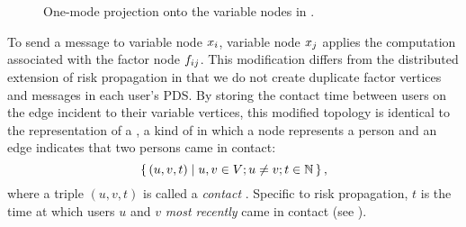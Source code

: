 \begin{figure}[htb]
\centering
{}
\caption[One-mode projection of a factor graph]{One-mode projection onto the variable nodes in .}
\label{fig:projected}
\end{figure}

To send a message to variable node $\vVariable[i]$, variable node $\vVariable[j]$ applies the computation associated with the factor node $\vFactor[ij]$. This modification differs from the distributed extension of risk propagation \citep{Ayday2021} in that we do not create duplicate factor vertices and messages in each user's PDS. By storing the contact time between users on the edge incident to their variable vertices, this modified topology is identical to the  representation of a , a kind of  in which a node represents a person and an edge indicates that two persons came in contact:
\begin{equation}
  \set{ (u, v, t) | u, v \in V; u \neq v; t \in \mathbb{N}}, \label{eq:contact-sequence}
\end{equation}
where a triple $(u, v, t)$ is called a \emph{contact} \citep{Holme2012}. Specific to risk propagation, $t$ is the time at which users $u$ and $v$ \emph{most recently} came in contact (see ).

